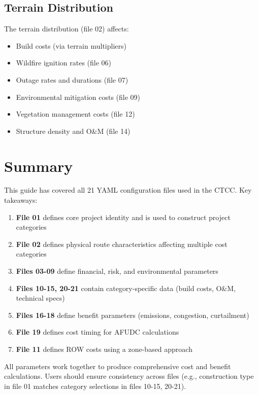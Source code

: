 \documentclass[ctcc_full_documentation.tex]{subfiles}
\begin{document}
\subsection{Terrain Distribution}

The terrain distribution (file 02) affects:
\begin{itemize}
    \item Build costs (via terrain multipliers)
    \item Wildfire ignition rates (file 06)
    \item Outage rates and durations (file 07)
    \item Environmental mitigation costs (file 09)
    \item Vegetation management costs (file 12)
    \item Structure density and O\&M (file 14)
\end{itemize}

\section{Summary}

This guide has covered all 21 YAML configuration files used in the CTCC. Key takeaways:

\begin{enumerate}
    \item \textbf{File 01} defines core project identity and is used to construct project categories
    \item \textbf{File 02} defines physical route characteristics affecting multiple cost categories
    \item \textbf{Files 03-09} define financial, risk, and environmental parameters
    \item \textbf{Files 10-15, 20-21} contain category-specific data (build costs, O\&M, technical specs)
    \item \textbf{Files 16-18} define benefit parameters (emissions, congestion, curtailment)
    \item \textbf{File 19} defines cost timing for AFUDC calculations
    \item \textbf{File 11} defines ROW costs using a zone-based approach
\end{enumerate}

All parameters work together to produce comprehensive cost and benefit calculations. Users should ensure consistency across files (e.g., construction type in file 01 matches category selections in files 10-15, 20-21).
\end{document}
